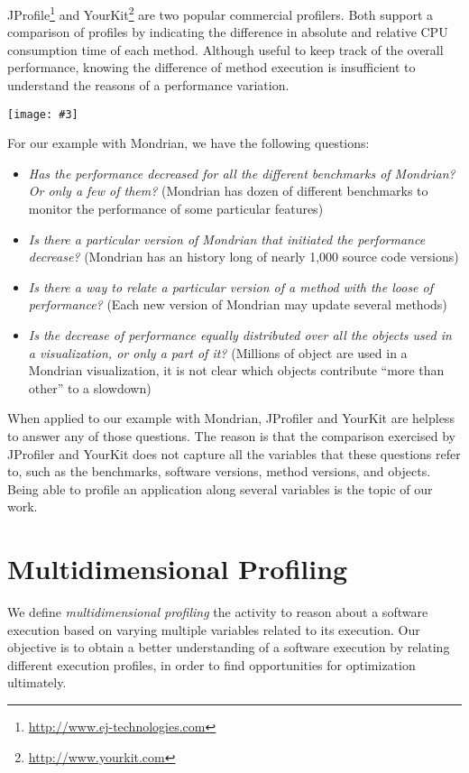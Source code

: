 \documentclass{sig-alternate}
\newcommand{\largefig}[4]{
	\begin{figure*}[#1]
		\centering
		\texttt{[image: \#3]}
		\caption{\label{fig:#3}#4}
	\end{figure*}}
\begin{document}
JProfile\footnote{\url{http://www.ej-technologies.com}} and YourKit\footnote{\url{http://www.yourkit.com}} are two popular commercial profilers. Both support a comparison of profiles by indicating the difference in absolute and relative CPU consumption time of each method. Although useful to keep track of the overall performance, knowing the difference of method execution is insufficient to understand the reasons of a performance variation. 

\largefig{}{0.7}{final}{}

For our example with Mondrian, we have the following questions:
\begin{itemize}
\item \emph{Has the performance decreased for all the different benchmarks of Mondrian? Or only a few of them?} (Mondrian has dozen of different benchmarks to monitor the performance of some particular features)
\item \emph{Is there a particular version of Mondrian that initiated the performance decrease?} (Mondrian has an history long of nearly 1,000 source code versions)
\item \emph{Is there a way to relate a particular version of a method with the loose of performance?} (Each new version of Mondrian may update several methods)
\item \emph{Is the decrease of performance equally distributed over all the objects used in a visualization, or only a part of it?} (Millions of object are used in a Mondrian visualization, it is not clear which objects contribute ``more than other'' to a slowdown)
\end{itemize}

When applied to our example with Mondrian, JProfiler and YourKit are helpless to answer any of those questions. The reason is that the comparison exercised by JProfiler and YourKit does not capture all the variables that these questions refer to, such as the benchmarks, software versions, method versions, and objects. Being able to profile an application along several variables is the topic of our work.

\section{Multidimensional Profiling}

We define \emph{multidimensional profiling} the activity to reason about a software execution based on varying multiple variables related to its execution. Our objective is to obtain a better understanding of a software execution by relating different execution profiles, in order to find opportunities for optimization ultimately.
\end{document}

